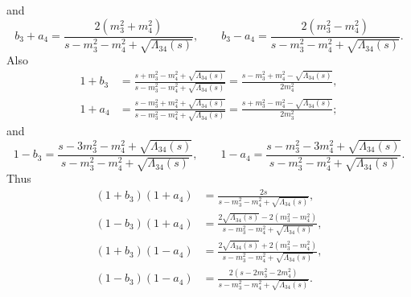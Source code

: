 and
\begin{equation}
	b_{3} + a_{4} = \frac{ 2 \left( m_{3}^{2} + m_{4}^{2} \right)}{s - m_{3}^{2} - m_{4}^{2} + \sqrt{\Lambda_{34}(s)}}, \qquad
	b_{3} - a_{4} = \frac{ 2 \left( m_{3}^{2} - m_{4}^{2} \right)}{s - m_{3}^{2} - m_{4}^{2} + \sqrt{\Lambda_{34}(s)}}.
\end{equation}
Also
\begin{align}
	1 + b_{3} &= \frac{s + m_{3}^{2} - m_{4}^{2} + \sqrt{\Lambda_{34}(s)}}{s - m_{3}^{2} - m_{4}^{2} + \sqrt{\Lambda_{34}(s)}} = \frac{s - m_{3}^{2} + m_{4}^{2} - \sqrt{\Lambda_{34}(s)}}{2m_{4}^{2}}, \\
	1 + a_{4} &= \frac{s - m_{3}^{2} + m_{4}^{2} + \sqrt{\Lambda_{34}(s)}}{s - m_{3}^{2} - m_{4}^{2} + \sqrt{\Lambda_{34}(s)}} = \frac{s + m_{3}^{2} - m_{4}^{2} - \sqrt{\Lambda_{34}(s)}}{2m_{3}^{2}};
\end{align}
and
\begin{equation}
	1 - b_{3} = \frac{s - 3m_{3}^{2} - m_{4}^{2} + \sqrt{\Lambda_{34}(s)}}{s - m_{3}^{2} - m_{4}^{2} + \sqrt{\Lambda_{34}(s)}}, \qquad
	1 - a_{4} = \frac{s - m_{3}^{2} - 3m_{4}^{2} + \sqrt{\Lambda_{34}(s)}}{s - m_{3}^{2} - m_{4}^{2} + \sqrt{\Lambda_{34}(s)}}.
\end{equation}
Thus
\begin{align}
	\left( 1 + b_{3} \right) \left( 1 + a_{4} \right) &= \frac{2s}{s - m_{3}^{2} - m_{4}^{2} + \sqrt{\Lambda_{34}(s)}}, \\
	\left( 1 - b_{3} \right) \left( 1 + a_{4} \right) &= \frac{ 2 \sqrt{\Lambda_{34}(s)} - 2 \left( m_{3}^{2} - m_{4}^{2} \right)}{s - m_{3}^{2} - m_{4}^{2} + \sqrt{\Lambda_{34}(s)}}, \\
	\left( 1 + b_{3} \right) \left( 1 - a_{4} \right) &= \frac{ 2 \sqrt{\Lambda_{34}(s)} + 2 \left( m_{3}^{2} - m_{4}^{2} \right)}{s - m_{3}^{2} - m_{4}^{2} + \sqrt{\Lambda_{34}(s)}}, \\
	\left( 1 - b_{3} \right) \left( 1 - a_{4} \right) &= \frac{ 2 \left( s - 2m_{3}^{2} - 2m_{4}^{2} \right)}{s - m_{3}^{2} - m_{4}^{2} + \sqrt{\Lambda_{34}(s)}}.
\end{align}

